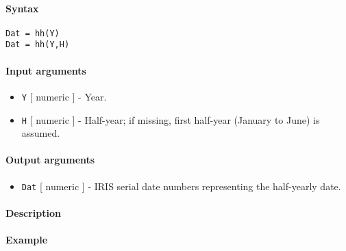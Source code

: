 


	\paragraph{Syntax}\label{syntax}

\begin{verbatim}
Dat = hh(Y)
Dat = hh(Y,H)
\end{verbatim}

\paragraph{Input arguments}\label{input-arguments}

\begin{itemize}
\item
  \texttt{Y} {[} numeric {]} - Year.
\item
  \texttt{H} {[} numeric {]} - Half-year; if missing, first half-year
  (January to June) is assumed.
\end{itemize}

\paragraph{Output arguments}\label{output-arguments}

\begin{itemize}
\itemsep1pt\parskip0pt
\item
  \texttt{Dat} {[} numeric {]} - IRIS serial date numbers representing
  the half-yearly date.
\end{itemize}

\paragraph{Description}\label{description}

\paragraph{Example}\label{example}


